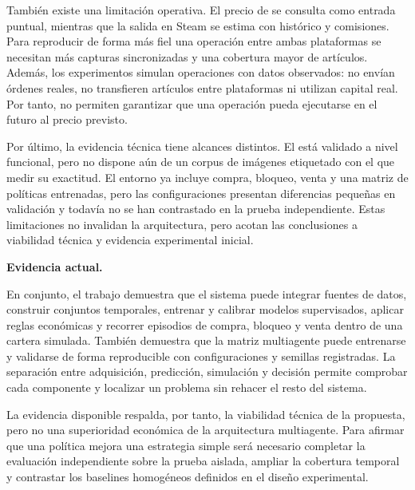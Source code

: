 También existe una limitación operativa. El precio de  se consulta como entrada puntual, mientras que la salida en Steam se estima con histórico y comisiones. Para reproducir de forma más fiel una operación entre ambas plataformas se necesitan más capturas sincronizadas y una cobertura mayor de artículos. Además, los experimentos simulan operaciones con datos observados: no envían órdenes reales, no transfieren artículos entre plataformas ni utilizan capital real. Por tanto, no permiten garantizar que una operación pueda ejecutarse en el futuro al precio previsto.

Por último, la evidencia técnica tiene alcances distintos. El  está validado a nivel funcional, pero no dispone aún de un corpus de imágenes etiquetado con el que medir su exactitud. El entorno  ya incluye compra, bloqueo, venta y una matriz de políticas entrenadas, pero las configuraciones presentan diferencias pequeñas en validación y todavía no se han contrastado en la prueba independiente. Estas limitaciones no invalidan la arquitectura, pero acotan las conclusiones a viabilidad técnica y evidencia experimental inicial.

\textbf{Evidencia actual.}

En conjunto, el trabajo demuestra que el sistema puede integrar fuentes de datos, construir conjuntos temporales, entrenar y calibrar modelos supervisados, aplicar reglas económicas y recorrer episodios de compra, bloqueo y venta dentro de una cartera simulada. También demuestra que la matriz multiagente puede entrenarse y validarse de forma reproducible con configuraciones y semillas registradas. La separación entre adquisición, predicción, simulación y decisión permite comprobar cada componente y localizar un problema sin rehacer el resto del sistema.

La evidencia disponible respalda, por tanto, la viabilidad técnica de la propuesta, pero no una superioridad económica de la arquitectura multiagente. Para afirmar que una política mejora una estrategia simple será necesario completar la evaluación independiente sobre la prueba aislada, ampliar la cobertura temporal y contrastar los baselines homogéneos definidos en el diseño experimental.
